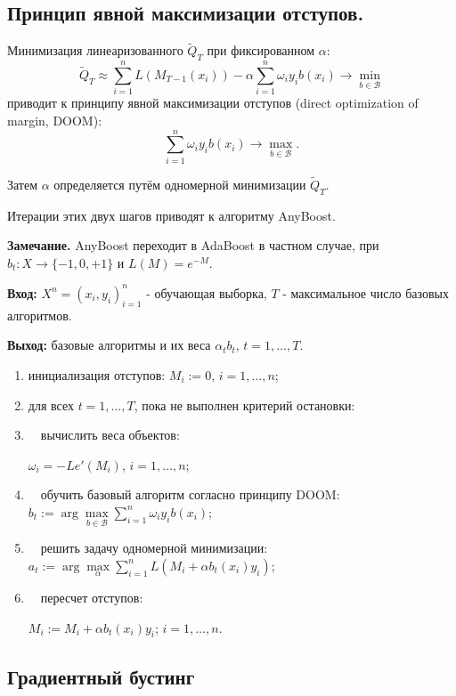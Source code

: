 \documentclass{article}
\theoremstyle{definition}
\theoremstyle{theorem}
\theoremstyle{remark}
\theoremstyle{theorem}
\theoremstyle{example}
\theoremstyle{theorem}
\theoremstyle{theorem}
\theoremstyle{theorem}
\theoremstyle{theorem}
\begin{document}
\subsection{Принцип явной максимизации отступов.}
Минимизация линеаризованного $\widetilde {Q}_T$ при фиксированном $\alpha$:
$$\widetilde {Q}_T \approx \sum_{i=1}^{n} L (M_{T-1}(x_i)) - \alpha \sum_{i=1}^{n} \omega_i y_i b(x_i) \to \min \limits_{b \in \mathcal{B}}$$
приводит к принципу явной максимизации отступов (direct optimization of margin, DOOM):
$$\sum_{i=1}^{n} \omega_i y_i b(x_i) \to \max \limits_{b \in \mathcal{B}}.$$

Затем $\alpha$ определяется путём одномерной минимизации $\widetilde {Q}_T$.
\vspace{0.2cm}

Итерации этих двух шагов приводят к алгоритму AnyBoost.
\vspace{0.2cm}

\textbf{Замечание.} AnyBoost переходит в AdaBoost в частном случае,
при $b_t: X \to \{-1, 0, +1\}$ и $L(M) = e^{-M}$.

\textbf{Вход:} $X^n = (x_i,y_i)_{i=1}^n$ - обучающая выборка, $T$ - максимальное число базовых алгоритмов.
\vspace{0.2cm}

\textbf{Выход:} базовые алгоритмы и их веса $\alpha_t b_t$, $t = 1, \ldots, T$.
\vspace{0.2cm}

\begin{enumerate}
	\item инициализация отступов: $M_i := 0$, $i = 1, \ldots, n$;
	\item для всех $t=1,\ldots,T$, пока не выполнен критерий остановки:
	\item  $\quad$вычислить веса объектов:
	
	$\omega_i = -L e'(M_i)$, $i = 1, \ldots, n$;
	\item   $\quad$обучить базовый алгоритм согласно принципу DOOM: 
	$b_t := \arg \max \limits_{b \in \mathcal{B}} \sum_{i=1}^{n} \omega_i y_i b(x_i)$;
	\item   $\quad$решить задачу одномерной минимизации:
	$a_t := \arg \max \limits_{\alpha} \sum_{i=1}^{n} L(M_i+\alpha b_t(x_i) y_i)$;
	\item   $\quad$пересчет отступов: 
	
	$M_i := M_i +\alpha b_t(x_i) y_i$; $i = 1, \ldots, n$.
\end{enumerate}

\subsection{Градиентный бустинг}\label{grad.b}
\end{document}
